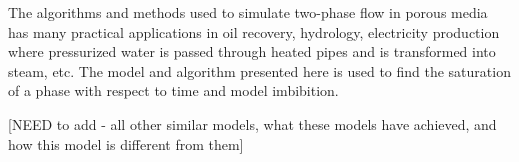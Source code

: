 The algorithms and methods used to simulate two-phase flow in porous media has many practical applications in oil recovery, hydrology, electricity production where pressurized water is passed through heated pipes and is transformed into steam, etc. The model and algorithm presented here is used to find the saturation of a phase with respect to time and model imbibition.

[NEED to add - all other similar models, what these models have achieved, and how this model is different from them]
